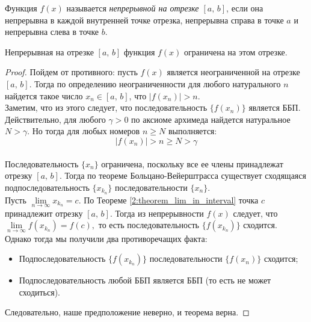 

\begin{definition}
Функция \(f(x)\) называется \textit{непрерывной на отрезке \([a, \, b]\)}, если она
непрерывна в каждой внутренней точке отрезка, непрерывна справа в точке \(a\)
и непрерывна слева в точке \(b\).
\end{definition}

\begin{theorem}
Непрерывная на отрезке \([a, \, b]\) функция \(f(x)\) ограничена на этом отрезке.

\begin{proof}
Пойдем от противного: пусть \(f(x)\) является неограниченной на отрезке \([a, \, b]\).
Тогда по определению неограниченности для любого натурального \(n\) найдется
такое число \(x_{n} \in [a, \, b]\), что \(|f(x_{n})| > n\). \\

Заметим, что из этого следует, что последовательность \(\{f(x_{n})\}\) является ББП.
Действительно, для любого \(\gamma > 0\) по аксиоме архимеда найдется натуральное \(N > \gamma\).
Но тогда для любых номеров \(n \geq N\) выполняется:
\[
|f(x_{n})| > n \geq N > \gamma
\]
\\
Последовательность \(\{x_{n}\}\) ограничена, поскольку все ее члены принадлежат
отрезку \([a, \, b]\). Тогда по теореме Больцано-Вейерштрасса существует
сходящаяся подпоследовательность \(\{x_{k_{n}}\}\) последовательности \(\{x_{n}\}\). \\

Пусть \(\lim\limits_{n \to \infty} x_{k_{n}} = c\). По Теореме \ref{2:theorem_lim_in_interval}
точка \(c\) принадлежит отрезку \([a, \, b]\). Тогда из непрерывности \(f(x)\) следует,
что \(\lim\limits_{n \to \infty} f(x_{k_{n}}) = f(c),\) то есть последовательность
\(\{f(x_{k_{n}})\}\) сходится. \\

Однако тогда мы получили два противоречащих факта:
\begin{itemize}
\item Подпоследовательность \(\{f(x_{k_{n}})\}\) последовательности \(\{f(x_{n})\}\)
сходится;
\item Подпоследовательность любой ББП является ББП (то есть не может сходиться).
\end{itemize}

Следовательно, наше предположение неверно, и теорема верна.
\end{proof}
\end{theorem}

